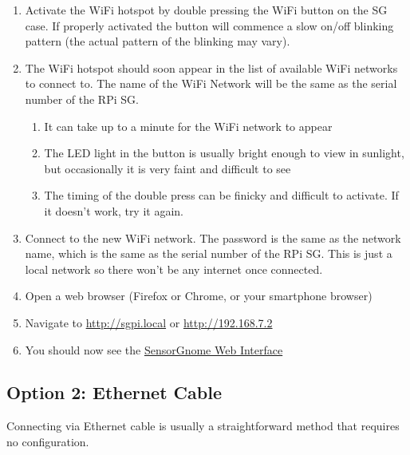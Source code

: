 \documentclass[
]{book}
\begin{document}
\begin{enumerate}
\def\labelenumi{\arabic{enumi}.}
\item
  Activate the WiFi hotspot by double pressing the WiFi button on the SG case. If properly activated the button will commence a slow on/off blinking pattern (the actual pattern of the blinking may vary).
\item
  The WiFi hotspot should soon appear in the list of available WiFi networks to connect to. The name of the WiFi Network will be the same as the serial number of the RPi SG.

  \begin{enumerate}
  \def\labelenumii{\alph{enumii})}
  \item
    It can take up to a minute for the WiFi network to appear
  \item
    The LED light in the button is usually bright enough to view in sunlight, but occasionally it is very faint and difficult to see
  \item
    The timing of the double press can be finicky and difficult to activate. If it doesn't work, try it again.
  \end{enumerate}
\item
  Connect to the new WiFi network. The password is the same as the network name, which is the same as the serial number of the RPi SG. This is just a local network so there won't be any internet once connected.
\item
  Open a web browser (Firefox or Chrome, or your smartphone browser)
\item
  Navigate to \url{http://sgpi.local} or \url{http://192.168.7.2}
\item
  You should now see the \protect\hyperlink{webinterface}{SensorGnome Web Interface}
\end{enumerate}

\hypertarget{ethernet}{%
\subsection{Option 2: Ethernet Cable}\label{ethernet}}

Connecting via Ethernet cable is usually a straightforward method that requires no configuration.
\end{document}

